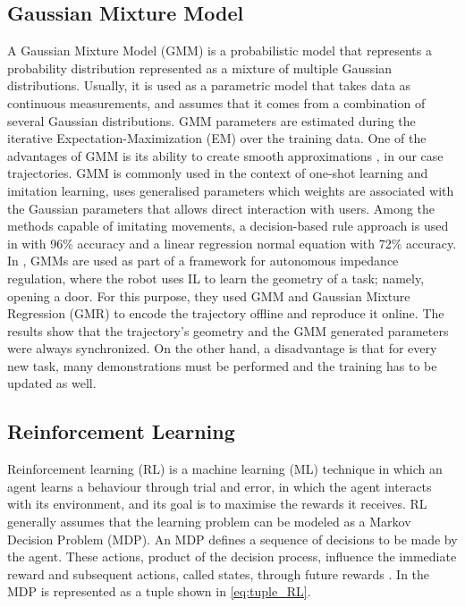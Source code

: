 \documentclass[thesis]{mas_proposal}
\begin{document}
    \subsection{Gaussian Mixture Model}
    
    A Gaussian Mixture Model (GMM) is a probabilistic model that represents a probability distribution represented as a mixture of multiple Gaussian distributions. Usually, it is used as a parametric model that takes data as continuous measurements, and assumes that it comes from a combination of several Gaussian distributions. GMM parameters are estimated during the iterative Expectation-Maximization (EM) over the training data. One of the advantages of GMM is its ability to create smooth approximations \cite{Reynolds2009}, in our case trajectories. GMM is commonly used in the context of one-shot learning and imitation learning, uses generalised parameters which weights are associated with the Gaussian parameters that allows direct interaction with users. Among the methods capable of imitating movements, a decision-based rule approach is used in \cite{Itauma2012} with 96\% accuracy and a linear regression normal equation with 72\% accuracy. In \cite{Wu2020}, GMMs are used as part of a framework for autonomous impedance regulation, where the robot uses IL to learn the geometry of a task; namely, opening a door. For this purpose, they used GMM and Gaussian Mixture Regression (GMR) to encode the trajectory offline and reproduce it online. The results show that the trajectory's geometry and the GMM generated parameters were always synchronized. On the other hand, a disadvantage is that for every new task, many demonstrations must be performed and the training has to be updated as well.
    
    \subsection{Reinforcement Learning}
    
    Reinforcement learning (RL) is a machine learning (ML) technique in which an agent learns a behaviour through trial and error, in which the agent interacts with its environment, and its goal is to maximise the rewards it receives. RL generally assumes that the learning problem can be modeled as a Markov Decision Problem (MDP). An MDP defines a sequence of decisions to be made by the agent. These actions, product of the decision process, influence the immediate reward and subsequent actions, called states, through future rewards \cite{Kaelbling1996, Brunke2022, Elguea2023}. In \cite{Elguea2023} the MDP is represented as a tuple shown in \ref{eq:tuple_RL}. 
    
\end{document}
